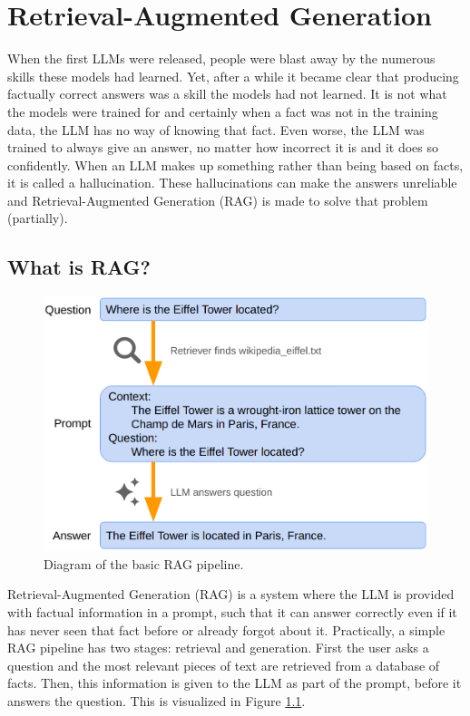 
\chapter{Retrieval-Augmented Generation}
\label{sec:rag}

When the first LLMs were released, people were blast away by the numerous skills these models had learned. Yet, after a while it became clear that producing factually correct answers was a skill the models had not learned. It is not what the models were trained for and certainly when a fact was not in the training data, the LLM has no way of knowing that fact. Even worse, the LLM was trained to always give an answer, no matter how incorrect it is and it does so confidently. When an LLM makes up something rather than being based on facts, it is called a hallucination. These hallucinations can make the answers unreliable and Retrieval-Augmented Generation (RAG) is made to solve that problem (partially).

\section{What is RAG?}

\begin{figure}[h]
	\centering
	\captionsetup{justification=centering}
	\includegraphics[width=0.6\linewidth]{fig/RAG.png}
	\caption{Diagram of the basic RAG pipeline.}
	\label{fig:rag}
\end{figure}

Retrieval-Augmented Generation (RAG) is a system where the LLM is provided with factual information in a prompt, such that it can answer correctly even if it has never seen that fact before or already forgot about it. Practically, a simple RAG pipeline has two stages: retrieval and generation. First the user asks a question and the most relevant pieces of text are retrieved from a database of facts. Then, this information is given to the LLM as part of the prompt, before it answers the question. This is visualized in Figure \ref{fig:rag}.

